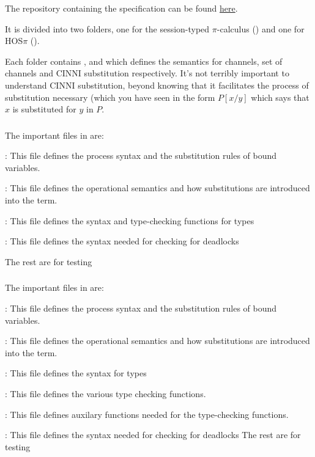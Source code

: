 The repository containing the specification can be found \href{https://gitlab.com/calrare1/session-types/-/tree/master}{here}.

It is divided into two folders, one for the session-typed $\pi$-calculus () and one for HOS$\pi$ ().

Each folder contains ,  and  which defines the semantics for channels, set of channels and CINNI substitution respectively. It's not terribly important to understand CINNI substitution, beyond knowing that it facilitates the process of substitution necessary (which you have seen in the form $P[x/y]$ which says that $x$ is substituted for $y$ in $P$.

\subsubsection{}
The important files in  are:
\bi
    \item {}: This file defines the process syntax and the substitution rules of bound variables.
    \item {}: This file defines the operational semantics and how substitutions are introduced into the term.
    \item {}: This file defines the syntax and type-checking functions for types
    \item {}: This file defines the syntax needed for checking for deadlocks
\ei

The rest are for testing
\subsubsection{}
The important files in  are:
\bi
    \item {}: This file defines the process syntax and the substitution rules of bound variables.
    \item {}: This file defines the operational semantics and how substitutions are introduced into the term.
    \item {}: This file defines the syntax for types
    \item {}: This file defines the various type checking functions.
    \item {}: This file defines auxilary functions needed for the type-checking functions.
    \item {}: This file defines the syntax needed for checking for deadlocks
\ei
The rest are for testing